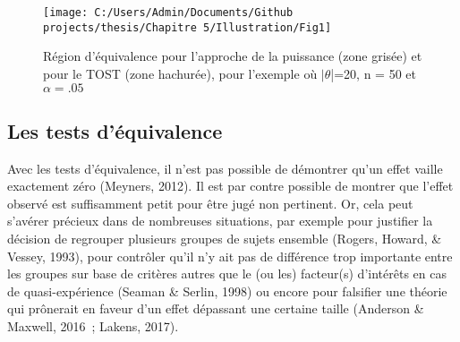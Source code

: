 \documentclass[
  12pt,
  french,
]{article}
\begin{document}
\begin{figure}

{\centering \texttt{[image: C:/Users/Admin/Documents/Github projects/thesis/Chapitre 5/Illustration/Fig1]} 

}

\caption{Région d'équivalence pour l'approche de la puissance (zone grisée) et pour le TOST (zone hachurée), pour l'exemple où $|\theta$|=20, n = 50 et $\alpha=.05$}\label{fig:schuirman2}
\end{figure}

\newpage

\hypertarget{les-tests-duxe9quivalence}{%
\subsection{Les tests d'équivalence}\label{les-tests-duxe9quivalence}}

Avec les tests d'équivalence, il n'est pas possible de démontrer qu'un
effet vaille exactement zéro (Meyners, 2012). Il est par contre possible
de montrer que l'effet observé est suffisamment petit pour être jugé non
pertinent. Or, cela peut s'avérer précieux dans de nombreuses
situations, par exemple pour justifier la décision de regrouper
plusieurs groupes de sujets ensemble (Rogers, Howard, \& Vessey, 1993),
pour contrôler qu'il n'y ait pas de différence trop importante entre les
groupes sur base de critères autres que le (ou les) facteur(s)
d'intérêts en cas de quasi-expérience (Seaman \& Serlin, 1998) ou encore
pour falsifier une théorie qui prônerait en faveur d'un effet dépassant
une certaine taille (Anderson \& Maxwell, 2016~; Lakens, 2017).
\end{document}
